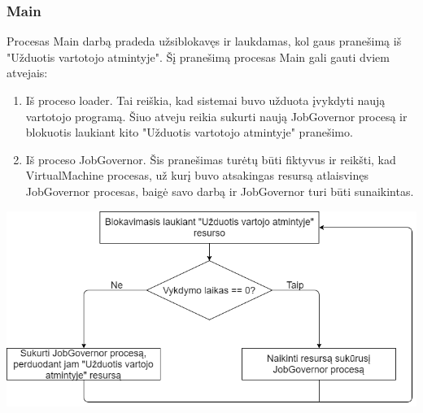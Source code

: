 \documentclass{scrartcl}
\begin{document}
      \subsubsection{Main}
        Procesas Main darbą pradeda užsiblokavęs ir laukdamas, kol gaus pranešimą iš "Užduotis vartotojo atmintyje". Šį pranešimą procesas Main gali gauti dviem atvejais:
        \begin{enumerate}
          \item Iš proceso loader. Tai reiškia, kad sistemai buvo užduota įvykdyti naują vartotojo programą. Šiuo atveju reikia sukurti naują JobGovernor procesą ir blokuotis laukiant kito "Užduotis vartotojo atmintyje" pranešimo.
          \item Iš proceso JobGovernor. Šis pranešimas turėtų būti fiktyvus ir reikšti, kad VirtualMachine procesas, už kurį buvo atsakingas resursą atlaisvinęs JobGovernor procesas, baigė savo darbą ir JobGovernor turi būti sunaikintas.
        \end{enumerate}
        \begin{center}
          \includegraphics[scale=0.5]{Main}
        \end{center}
\end{document}
